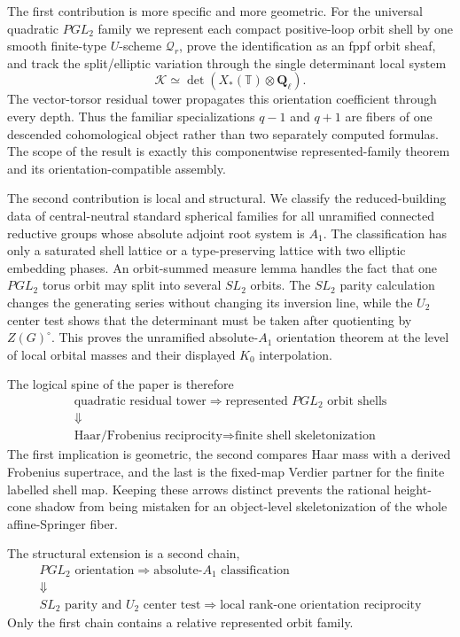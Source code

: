 \documentclass[11pt]{article}
\theoremstyle{definition}
\theoremstyle{remark}
\newcommand{\Qell}{\mathbf Q_\ell}
\newcommand{\cK}{\mathcal K}
\begin{document}
The first contribution is more specific and more geometric.  For the universal
quadratic $PGL_2$ family we represent each compact positive-loop orbit shell
by one smooth finite-type $U$-scheme $\mathscr Q_r$, prove the identification
as an fppf orbit sheaf, and track the split/elliptic variation through the
single determinant local system
\[
 \cK\simeq\det(X_*(\mathbb T)\otimes\Qell).
\]
The vector-torsor residual tower propagates this orientation coefficient
through every depth.  Thus the familiar specializations $q-1$ and $q+1$ are
fibers of one descended cohomological object rather than two separately
computed formulas.  The scope of the result is exactly this componentwise
represented-family theorem and its orientation-compatible assembly.

The second contribution is local and structural.  We classify the
reduced-building data of central-neutral standard spherical families for all
unramified connected reductive groups whose absolute adjoint root system is
$A_1$.  The classification has only a saturated shell lattice or a
type-preserving lattice with two elliptic embedding phases.  An orbit-summed
measure lemma handles the fact that one $PGL_2$ torus orbit may split into
several $SL_2$ orbits.  The $SL_2$ parity calculation changes the generating
series without changing its inversion line, while the $U_2$ center test shows
that the determinant must be taken after quotienting by $Z(G)^\circ$.  This
proves the unramified absolute-$A_1$ orientation theorem at the level of local
orbital masses and their displayed $K_0$ interpolation.

The logical spine of the paper is therefore
\[
 \boxed{
 \begin{gathered}
 \text{quadratic residual tower}
 \Longrightarrow
 \text{represented }PGL_2\text{ orbit shells}\\
 \Downarrow\\
 \text{Haar/Frobenius reciprocity}
 \Longrightarrow
 \text{finite shell skeletonization}
 \end{gathered}}
\]
The first implication is geometric, the second compares Haar mass with a
derived Frobenius supertrace, and the last is the fixed-map Verdier partner
for the finite labelled shell map.  Keeping these arrows distinct prevents
the rational height-cone shadow from being mistaken for an object-level
skeletonization of the whole affine-Springer fiber.

The structural extension is a second chain,
\[
 \begin{gathered}
 PGL_2\text{ orientation}
 \Longrightarrow
 \text{absolute-}A_1\text{ classification}\\
 \Downarrow\\
 SL_2\text{ parity and }U_2\text{ center test}
 \Longrightarrow
 \text{local rank-one orientation reciprocity}
 \end{gathered}
\]
Only the first chain contains a relative represented orbit family.
\end{document}
